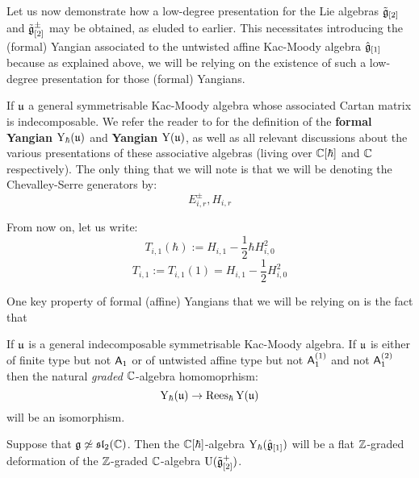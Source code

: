         Let us now demonstrate how a low-degree presentation for the Lie algebras $\tilde{\mathfrak{g}}_{[2]}$ and $\tilde{\mathfrak{g}}_{[2]}^{\pm}$ may be obtained, as eluded to earlier. This necessitates introducing the (formal) Yangian associated to the untwisted affine Kac-Moody algebra $\hat{\mathfrak{g}}_{[1]}$ because as explained above, we will be relying on the existence of such a low-degree presentation for those (formal) Yangians.
        \begin{convention}
            If $\mathfrak{u}$ a general symmetrisable Kac-Moody algebra whose associated Cartan matrix is indecomposable. We refer the reader to \cite[Section 2]{guay_nakajima_wendlandt_affine_yangian_coproduct} for the definition of the \textbf{formal Yangian} $\mathrm{Y}_{\hbar}(\mathfrak{u})$ and \textbf{Yangian} $\mathrm{Y}(\mathfrak{u})$, as well as all relevant discussions about the various  presentations of these associative algebras (living over $\mathbb{C}[\hbar]$ and $\mathbb{C}$ respectively). The only thing that we will note is that we will be denoting the Chevalley-Serre generators by:
                $$E_{i, r}^{\pm}, H_{i, r}$$
        \end{convention}
        \begin{convention}
            From now on, let us write:
                $$T_{i, 1}(\hbar) := H_{i, 1} - \frac12 \hbar H_{i, 0}^2$$
                $$T_{i, 1} := T_{i, 1}(1) = H_{i, 1} - \frac12 H_{i, 0}^2$$
        \end{convention}

        One key property of formal (affine) Yangians that we will be relying on is the fact that 
        \begin{lemma} \label{lemma: formal_yangians_as_rees_algebras}
            \cite[Theorem 6.10]{guay_nakajima_wendlandt_affine_yangian_vertex_representations_and_PBW} If $\mathfrak{u}$ is a general indecomposable symmetrisable Kac-Moody algebra. If $\mathfrak{u}$ is either of finite type but not $\mathsf{A}_1$ or of untwisted affine type but not $\mathsf{A}_1^{(1)}$ and not $\mathsf{A}_1^{(2)}$ then the natural \textit{graded} $\mathbb{C}$-algebra homomoprhism:
                $$\mathrm{Y}_{\hbar}(\mathfrak{u}) \to \operatorname{Rees}_{\hbar} \mathrm{Y}(\mathfrak{u})$$
            will be an isomorphism. 
        \end{lemma}
         \begin{corollary} \label{coro: formal_affine_yangians_as_flat_graded_deformations}
            Suppose that $\mathfrak{g} \not \simeq \mathfrak{sl}_2(\mathbb{C})$. Then the $\mathbb{C}[\hbar]$-algebra $\mathrm{Y}_{\hbar}(\hat{\mathfrak{g}}_{[1]})$ will be a flat $\mathbb{Z}$-graded deformation of the $\mathbb{Z}$-graded $\mathbb{C}$-algebra $\mathrm{U}(\tilde{\mathfrak{g}}_{[2]}^+)$. 
         \end{corollary}
         
